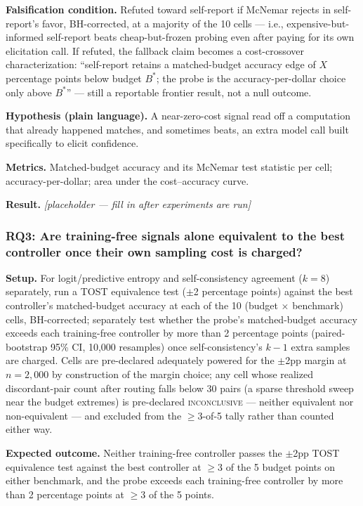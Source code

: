 \documentclass[11pt]{article}
\newcommand{\ph}{\textit{[placeholder --- fill in after experiments are run]}}
\begin{document}
\textbf{Falsification condition.} Refuted toward self-report if McNemar rejects in self-report's favor, BH-corrected, at a majority of the 10 cells --- i.e., expensive-but-informed self-report beats cheap-but-frozen probing even after paying for its own elicitation call. If refuted, the fallback claim becomes a cost-crossover characterization: ``self-report retains a matched-budget accuracy edge of $X$ percentage points below budget $B^*$; the probe is the accuracy-per-dollar choice only above $B^*$'' --- still a reportable frontier result, not a null outcome.

\textbf{Hypothesis (plain language).} A near-zero-cost signal read off a computation that already happened matches, and sometimes beats, an extra model call built specifically to elicit confidence.

\textbf{Metrics.} Matched-budget accuracy and its McNemar test statistic per cell; accuracy-per-dollar; area under the cost--accuracy curve.

\textbf{Result.} \ph

\subsubsection{RQ3: Are training-free signals alone equivalent to the best controller once their own sampling cost is charged?}
\textbf{Setup.} For logit/predictive entropy and self-consistency agreement ($k=8$) separately, run a TOST equivalence test ($\pm$2 percentage points) against the best controller's matched-budget accuracy at each of the 10 (budget $\times$ benchmark) cells, BH-corrected; separately test whether the probe's matched-budget accuracy exceeds each training-free controller by more than 2 percentage points (paired-bootstrap 95\% CI, 10,000 resamples) once self-consistency's $k-1$ extra samples are charged. Cells are pre-declared adequately powered for the $\pm$2pp margin at $n{=}2{,}000$ by construction of the margin choice; any cell whose realized discordant-pair count after routing falls below 30 pairs (a sparse threshold sweep near the budget extremes) is pre-declared \textsc{inconclusive} --- neither equivalent nor non-equivalent --- and excluded from the $\geq$3-of-5 tally rather than counted either way.

\textbf{Expected outcome.} Neither training-free controller passes the $\pm$2pp TOST equivalence test against the best controller at $\geq$3 of the 5 budget points on either benchmark, and the probe exceeds each training-free controller by more than 2 percentage points at $\geq$3 of the 5 points.
\end{document}
